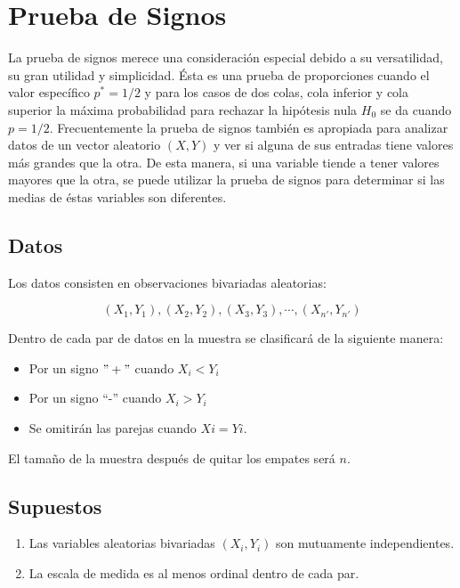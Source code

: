 \documentclass[
  a4paper,
  oneside,
  openany]{book}
\providecommand{\tightlist}{%
  \setlength{\itemsep}{0pt}\setlength{\parskip}{0pt}}
\begin{document}
\hypertarget{prueba-de-signos}{%
\chapter{Prueba de Signos}\label{prueba-de-signos}}

La prueba de signos merece una consideración especial debido a su versatilidad, su gran utilidad y simplicidad. Ésta es una prueba de proporciones cuando el valor específico \(p^*=1/2\) y para los casos de dos colas, cola inferior y cola superior la máxima probabilidad para rechazar la hipótesis nula \(H_0\) se da cuando \(p = 1/2\). Frecuentemente la prueba de signos también es apropiada para analizar datos de un vector aleatorio \((X,Y)\) y ver si alguna de sus entradas tiene valores más grandes que la otra. De esta manera, si una variable tiende a tener valores mayores que la otra, se puede utilizar la prueba de signos para determinar si las medias de éstas variables son diferentes.

\hypertarget{datos-2}{%
\section{Datos}\label{datos-2}}

Los datos consisten en observaciones bivariadas aleatorias:

\[(X_{1},Y_{1}),(X_{2},Y_{2}),(X_{3},Y_{3}),\cdots,(X_{n'},Y_{n'})\]

Dentro de cada par de datos en la muestra se clasificará de la siguiente manera:

\begin{itemize}
\tightlist
\item
  Por un signo \("+"\) cuando \(X_{i} < Y_{i}\)
\item
  Por un signo ``-'' cuando \(X_{i} > Y_{i}\)
\item
  Se omitirán las parejas cuando \(Xi = Yi\).
\end{itemize}

El tamaño de la muestra después de quitar los empates será \(n\).

\hypertarget{supuestos-2}{%
\section{Supuestos}\label{supuestos-2}}

\begin{enumerate}
\def\labelenumi{\arabic{enumi})}
\item
  Las variables aleatorias bivariadas \((X_{i},Y_{i})\) son mutuamente independientes.
\item
  La escala de medida es al menos ordinal dentro de cada par.
\end{enumerate}
\end{document}
